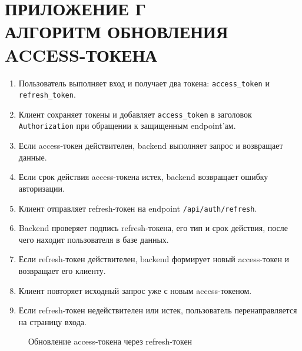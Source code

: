 \documentclass[14pt,a4paper]{extreport}
\begin{document}
\chapter*{ПРИЛОЖЕНИЕ Г\\АЛГОРИТМ ОБНОВЛЕНИЯ ACCESS-ТОКЕНА}

\begin{enumerate}
    \item Пользователь выполняет вход и получает два токена: \texttt{access\_token} и \texttt{refresh\_token}.
    \item Клиент сохраняет токены и добавляет \texttt{access\_token} в заголовок \texttt{Authorization} при обращении к защищенным endpoint'ам.
    \item Если access-токен действителен, backend выполняет запрос и возвращает данные.
    \item Если срок действия access-токена истек, backend возвращает ошибку авторизации.
    \item Клиент отправляет refresh-токен на endpoint \texttt{/api/auth/refresh}.
    \item Backend проверяет подпись refresh-токена, его тип и срок действия, после чего находит пользователя в базе данных.
    \item Если refresh-токен действителен, backend формирует новый access-токен и возвращает его клиенту.
    \item Клиент повторяет исходный запрос уже с новым access-токеном.
    \item Если refresh-токен недействителен или истек, пользователь перенаправляется на страницу входа.
\end{enumerate}

\begin{figure}[H]
\centering
{}
\caption{Обновление access-токена через refresh-токен}
\end{figure}
\end{document}
